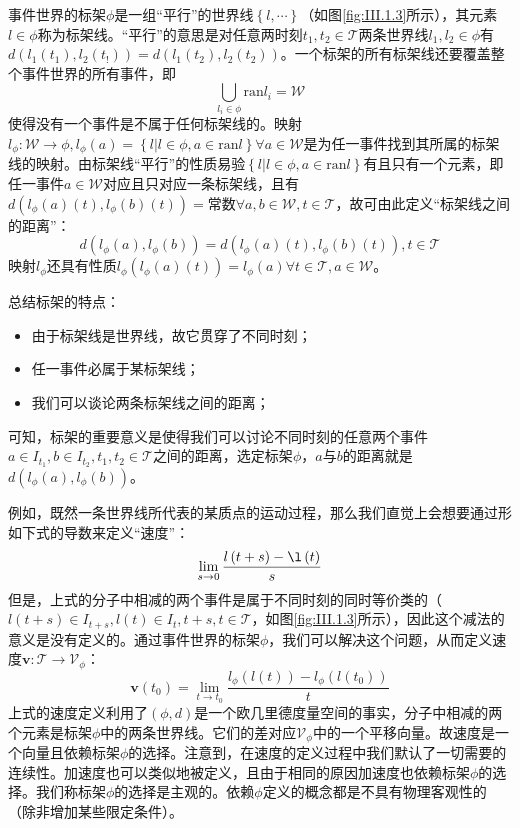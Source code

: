 \documentclass[main.tex]{subfiles}
\begin{document}
\begin{definition}[事件世界的标架]
事件世界的标架$\phi$是一组“平行”的世界线$\left\{l,\cdots\right\}$（如图\ref{fig:III.1.3}所示），其元素$l\in\phi$称为标架线。“平行”的意思是对任意两时刻$t_1,t_2\in\mathcal{T}$两条世界线$l_1,l_2\in\phi$有$d\left(l_1\left(t_1\right),l_2\left(t_!\right)\right)=d\left(l_1\left(t_2\right),l_2\left(t_2\right)\right)$。一个标架的所有标架线还要覆盖整个事件世界的所有事件，即
\[\bigcup_{l_i\in\phi}\mathrm{ran}l_i=\mathcal{W}\]
使得没有一个事件是不属于任何标架线的。映射$l_\phi:\mathcal{W}\rightarrow\phi,l_\phi\left(a\right)=\left\{l|l\in\phi,a\in\mathrm{ran}l\right\}\forall a\in\mathcal{W}$是为任一事件找到其所属的标架线的映射。由标架线“平行”的性质易验$\left\{l|l\in\phi,a\in\mathrm{ran}l\right\}$有且只有一个元素，即任一事件$a\in\mathcal{W}$对应且只对应一条标架线，且有$d\left(l_\phi\left(a\right)\left(t\right),l_\phi\left(b\right)\left(t\right)\right)=\text{常数}\forall a,b\in\mathcal{W},t\in\mathcal{T}$，故可由此定义“标架线之间的距离”：
\[d\left(l_\phi\left(a\right),l_\phi\left(b\right)\right)=d\left(l_\phi\left(a\right)\left(t\right),l_\phi\left(b\right)\left(t\right)\right),t\in\mathcal{T}\]
映射$l_\phi$还具有性质$l_\phi\left(l_\phi\left(a\right)\left(t\right)\right)=l_\phi\left(a\right)\forall t\in\mathcal{T},a\in\mathcal{W}$。
\end{definition}

总结标架的特点：
\begin{itemize}
    \item 由于标架线是世界线，故它贯穿了不同时刻；
    \item 任一事件必属于某标架线；
    \item 我们可以谈论两条标架线之间的距离；
\end{itemize}
可知，标架的重要意义是使得我们可以讨论不同时刻的任意两个事件$a\in I_{t_1},b\in I_{t_2},t_1,t_2\in\mathcal{T}$之间的距离，选定标架$\phi$，$a$与$b$的距离就是$d\left(l_\phi\left(a\right),l_\phi\left(b\right)\right)$。

例如，既然一条世界线所代表的某质点的运动过程，那么我们直觉上会想要通过形如下式的导数来定义“速度”：
\[
\lim_{s\to 0}\frac{l\left(t+s\right)-\l\left(t\right)}{s}\]
但是，上式的分子中相减的两个事件是属于不同时刻的同时等价类的（$l\left(t+s\right)\in I_{t+s},l\left(t\right)\in I_t,t+s,t\in\mathcal{T}$，如图\ref{fig:III.1.3}所示），因此这个减法的意义是没有定义的。通过事件世界的标架$\phi$，我们可以解决这个问题，从而定义速度$\mathbf{v}:\mathcal{T}\rightarrow\mathcal{V}_\phi$：
\[\mathbf{v}\left(t_0\right)=\lim_{t\to t_0}\frac{l_\phi\left(l\left(t\right)\right)-l_\phi\left(l\left(t_0\right)\right)}{t}\]
上式的速度定义利用了$\left(\phi,d\right)$是一个欧几里德度量空间的事实，分子中相减的两个元素是标架$\phi$中的两条世界线。它们的差对应$\mathcal{V}_\phi$中的一个平移向量。故速度是一个向量且依赖标架$\phi$的选择。注意到，在速度的定义过程中我们默认了一切需要的连续性。加速度也可以类似地被定义，且由于相同的原因加速度也依赖标架$\phi$的选择。我们称标架$\phi$的选择是主观的。依赖$\phi$定义的概念都是不具有物理客观性的（除非增加某些限定条件）。
\end{document}
